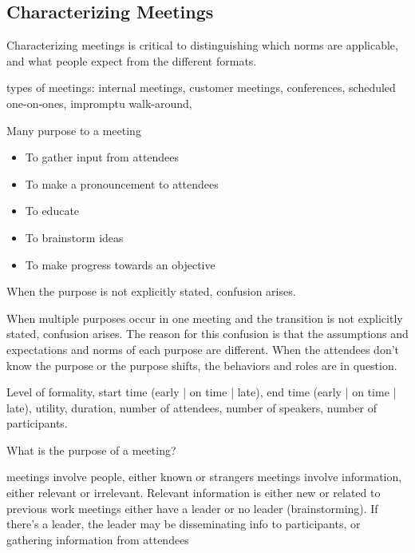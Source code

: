 \subsection{Characterizing Meetings}
Characterizing meetings is critical to distinguishing which norms are applicable, and what people expect from the different formats. 

types of meetings: internal meetings, customer meetings, conferences, scheduled one-on-ones, impromptu walk-around,  

Many purpose to a meeting
\begin{itemize}
    \item To gather input from attendees
    \item To make a pronouncement to attendees
    \item To educate
    \item To brainstorm ideas
    \item To make progress towards an objective
\end{itemize}
When the purpose is not explicitly stated, confusion arises.

When multiple purposes occur in one meeting and the transition is not explicitly stated, confusion arises.
The reason for this confusion is that the assumptions and expectations and norms of each purpose are different. When the attendees don't know the purpose or the purpose shifts, the behaviors and roles are in question.

Level of formality, start time (early | on time | late), 
end time (early | on time | late), utility, 
duration, number of attendees, number of speakers, number of participants.


What is the purpose of a meeting?

meetings involve people, either known or strangers
meetings involve information, either relevant or irrelevant. Relevant information is either new or related to previous work
meetings either have a leader or no leader (brainstorming). If there's a leader, the leader may be disseminating info to participants, or gathering information from attendees